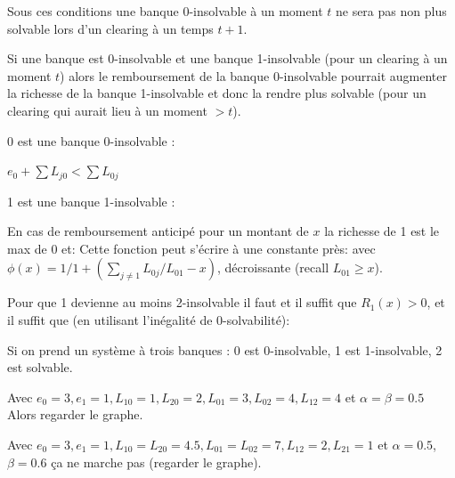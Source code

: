 \documentclass[11pt,oneside,twocolumn]{article}
\begin{document}
Sous ces conditions une banque 0-insolvable à un moment $t$ ne sera pas non plus solvable lors d'un clearing à un temps $t+1$.

Si une banque est 0-insolvable et une banque 1-insolvable (pour un clearing à un moment $t$) alors le remboursement de la banque 0-insolvable pourrait augmenter la richesse de la banque 1-insolvable et donc la rendre plus solvable (pour un clearing qui aurait lieu à un moment $>t$). 

0 est une banque 0-insolvable :

$e_0 + \sum L_{j0} < \sum L_{0j}$

1 est une banque 1-insolvable : 

En cas de remboursement anticipé pour un montant de $x$ la richesse de 1 est le max de 0 et:
Cette fonction peut s'écrire à une constante près:
avec $\phi(x) = 1/ 1 + (\sum_{j\neq 1}L_{0j}/L_{01}-x)$,
décroissante (recall $L_{01}\geq x$).

Pour que 1 devienne au moins 2-insolvable il faut et il suffit que $R_1(x)>0$, et il suffit que (en utilisant l'inégalité de 0-solvabilité):


Si on prend un système à trois banques :
0 est 0-insolvable, 1 est 1-insolvable, 2 est solvable.

Avec 
$e_0 = 3, e_1 = 1, L_{10}= 1, L_{20}=2, L_{01}=3, L_{02}=4, L_{12} = 4$ et 
$\alpha = \beta =0.5$
Alors regarder le graphe.

Avec $e_0 = 3, e_1 = 1, L_{10}=  L_{20}=4.5, L_{01}=L_{02}=7, L_{12} = 2, L_{21}=1$  et 
$\alpha = 0.5$, 
$\beta =0.6$ ça ne marche pas (regarder le graphe).
\end{document}
